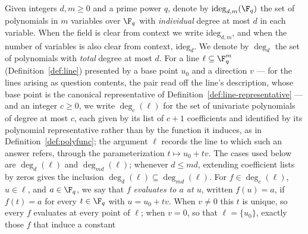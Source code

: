 \begin{definition}
	\label{def:ideg-deg-polynomials}
	\leanok
	Given integers $d, m \geq 0$ and a prime power $q$, denote by
	$\mathrm{ideg}_{d,m}(\F_q)$ the set of polynomials in $m$ variables over
	$\F_q$ with \emph{individual} degree at most $d$ in each variable. When
	the field is clear from context we write $\mathrm{ideg}_{d,m}$, and when
	the number of variables is also clear from context, $\mathrm{ideg}_d$. We
	denote by $\deg_d$ the set of polynomials with \emph{total} degree at
	most $d$.
	For a line $\ell \subseteq \F_q^m$ (Definition~\ref{def:line}) presented
	by a base point $u_0$ and a direction $v$ --- for the lines arising as
	question contents, the pair read off the line's description, whose base
	point is the canonical representative of
	Definition~\ref{def:line-representative} --- and an integer $c \geq 0$,
	we write $\deg_c(\ell)$ for the set of univariate polynomials of degree
	at most $c$, each given by its list of $c+1$ coefficients and identified
	by its polynomial representative rather than by the function it induces,
	as in Definition~\ref{def:polyfunc}; the argument $\ell$ records the
	line to which such an answer refers, through the parameterization
	$t \mapsto u_0 + tv$. The cases used below are $\deg_d(\ell)$ and
	$\deg_{md}(\ell)$; whenever $d \leq md$, extending coefficient lists by
	zeros gives the inclusion $\deg_d(\ell) \subseteq \deg_{md}(\ell)$. For
	$f \in \deg_c(\ell)$, $u \in \ell$, and $a \in \F_q$, we say that $f$
	\emph{evaluates to $a$ at $u$}, written $f(u) = a$, if $f(t) = a$ for
	every $t \in \F_q$ with $u = u_0 + tv$. When $v \neq 0$ this $t$ is
	unique, so every $f$ evaluates at every point of $\ell$; when $v = 0$,
	so that $\ell = \{u_0\}$, exactly those $f$ that induce a constant

\end{definition}
